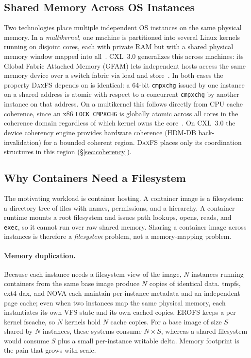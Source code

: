 \documentclass[letterpaper,twocolumn,10pt]{article}
\newcommand{\daxfs}{\textsc{DaxFS}\xspace}
\begin{document}
\subsection{Shared Memory Across OS Instances}

Two technologies place multiple independent OS instances on the same
physical memory.  In a \emph{multikernel}, one machine is partitioned
into several Linux kernels running on disjoint cores, each with private
RAM but with a shared physical memory window mapped into
all~\cite{baumann09:multikernel,barbalace15:popcorn}.  CXL~3.0
generalizes this across machines: its Global Fabric Attached Memory
(GFAM) lets independent hosts access the same memory device over a
switch fabric via load and store~\cite{cxl22:spec}.  In both cases the
property \daxfs depends on is identical: a 64-bit \texttt{cmpxchg}
issued by one instance on a shared address is atomic with respect to a
concurrent \texttt{cmpxchg} by another instance on that address.  On a
multikernel this follows directly from CPU cache coherence, since an
x86 \texttt{LOCK CMPXCHG} is globally atomic across all cores in the
coherence domain regardless of which kernel owns the
core~\cite{intel:sdm}.  On CXL~3.0 the device coherency engine provides
hardware coherence (HDM-DB back-invalidation) for a bounded coherent
region.  \daxfs places only its coordination structures in this region
(\S\ref{sec:coherency}).

\subsection{Why Containers Need a Filesystem}

The motivating workload is container hosting.  A container image is a
filesystem: a directory tree of files with names, permissions, and a
hierarchy.  A container runtime mounts a root filesystem and issues
path lookups, opens, reads, and \texttt{exec}, so it cannot run over
raw shared memory.  Sharing a container image across instances is
therefore a \emph{filesystem} problem, not a memory-mapping problem.

\paragraph{Memory duplication.}
Because each instance needs a filesystem view of the image, $N$
instances running containers from the same base image produce $N$
copies of identical data.  tmpfs, ext4-dax, and NOVA each maintain
per-instance metadata and an independent page cache; even when two
instances map the same physical memory, each instantiates its own VFS
state and its own cached copies.  EROFS keeps a per-kernel fscache, so
$N$ kernels hold $N$ cache copies.  For a base image of size $S$ shared
by $N$ instances, these systems consume $N\!\times\!S$, whereas a
shared filesystem would consume $S$ plus a small per-instance writable
delta.  Memory footprint is the pain that grows with scale.
\end{document}

